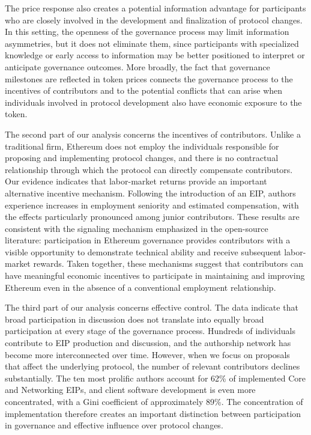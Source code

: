 \documentclass[No]{AEA}
\begin{document}
The price response also creates a potential information advantage for participants who are closely involved in the development and finalization of protocol changes. In this setting, the openness of the governance process may limit information asymmetries, but it does not eliminate them, since participants with specialized knowledge or early access to information may be better positioned to interpret or anticipate governance outcomes. More broadly, the fact that governance milestones are reflected in token prices connects the governance process to the incentives of contributors and to the potential conflicts that can arise when individuals involved in protocol development also have economic exposure to the token.

The second part of our analysis concerns the incentives of contributors. Unlike a traditional firm, Ethereum does not employ the individuals responsible for proposing and implementing protocol changes, and there is no contractual relationship through which the protocol can directly compensate contributors. Our evidence indicates that labor-market returns provide an important alternative incentive mechanism. Following the introduction of an EIP, authors experience increases in employment seniority and estimated compensation, with the effects particularly pronounced among junior contributors. These results are consistent with the signaling mechanism emphasized in the open-source literature: participation in Ethereum governance provides contributors with a visible opportunity to demonstrate technical ability and receive subsequent labor-market rewards. Taken together, these mechanisms suggest that contributors can have meaningful economic incentives to participate in maintaining and improving Ethereum even in the absence of a conventional employment relationship.

The third part of our analysis concerns effective control. The data indicate that broad participation in discussion does not translate into equally broad participation at every stage of the governance process. Hundreds of individuals contribute to EIP production and discussion, and the authorship network has become more interconnected over time. However, when we focus on proposals that affect the underlying protocol, the number of relevant contributors declines substantially. The ten most prolific authors account for 62\% of implemented Core and Networking EIPs, and client software development is even more concentrated, with a Gini coefficient of approximately 89\%. The concentration of implementation therefore creates an important distinction between participation in governance and effective influence over protocol changes.
\end{document}
